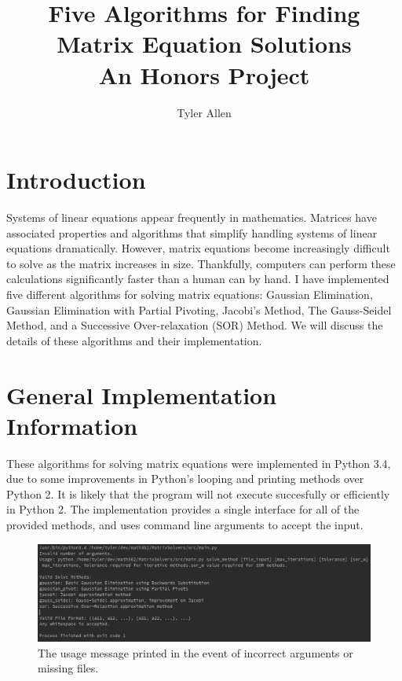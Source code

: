 \documentclass[12pt]{article}
\begin{document}
\title{Five Algorithms for Finding Matrix Equation Solutions\\An Honors Project}
\author{Tyler Allen}
\date{}

\maketitle
\newpage
\section{Introduction}

Systems of linear equations appear frequently in mathematics. Matrices have 
associated properties and algorithms that simplify handling systems of linear
equations dramatically. However, matrix equations become increasingly difficult to 
solve as the matrix increases in size. Thankfully, computers can perform these calculations
significantly faster than a human can by hand. I have implemented five different
algorithms for solving matrix equations: Gaussian Elimination, Gaussian Elimination with
Partial Pivoting, Jacobi's Method, The Gauss-Seidel Method, and a 
Successive Over-relaxation (SOR) Method. We will discuss the details of these 
algorithms and their implementation.



\section{General Implementation Information}
These algorithms for solving matrix equations  were implemented in Python 3.4, due to some improvements 
in Python's looping and printing methods over Python 2. It is likely that the
program will not execute succesfully or efficiently in Python 2. The implementation
provides a single interface for all of the provided methods, and uses command line 
arguments to accept the input. 

\begin{figure}[H]
\begin{center}
\includegraphics[scale=.4]{usage.png}
\caption{The usage message printed in the event of incorrect arguments or missing files.}
\label{usage}
\end{center}
\end{figure}
\end{document}
